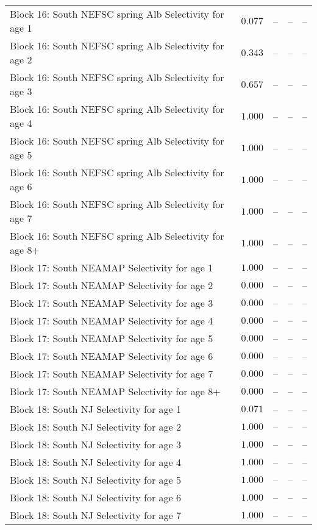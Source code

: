 \documentclass[
]{article}
\begin{document}
\begin{landscape}
\begin{longtable}[t]{lrrrr}
Block 16: South NEFSC spring Alb Selectivity for age 1 & $0.077$ & -- & -- & --\\
Block 16: South NEFSC spring Alb Selectivity for age 2 & $0.343$ & -- & -- & --\\
Block 16: South NEFSC spring Alb Selectivity for age 3 & $0.657$ & -- & -- & --\\
\addlinespace
Block 16: South NEFSC spring Alb Selectivity for age 4 & $1.000$ & -- & -- & --\\
Block 16: South NEFSC spring Alb Selectivity for age 5 & $1.000$ & -- & -- & --\\
Block 16: South NEFSC spring Alb Selectivity for age 6 & $1.000$ & -- & -- & --\\
Block 16: South NEFSC spring Alb Selectivity for age 7 & $1.000$ & -- & -- & --\\
Block 16: South NEFSC spring Alb Selectivity for age 8+ & $1.000$ & -- & -- & --\\
\addlinespace
Block 17: South NEAMAP Selectivity for age 1 & $1.000$ & -- & -- & --\\
Block 17: South NEAMAP Selectivity for age 2 & $0.000$ & -- & -- & --\\
Block 17: South NEAMAP Selectivity for age 3 & $0.000$ & -- & -- & --\\
Block 17: South NEAMAP Selectivity for age 4 & $0.000$ & -- & -- & --\\
Block 17: South NEAMAP Selectivity for age 5 & $0.000$ & -- & -- & --\\
\addlinespace
Block 17: South NEAMAP Selectivity for age 6 & $0.000$ & -- & -- & --\\
Block 17: South NEAMAP Selectivity for age 7 & $0.000$ & -- & -- & --\\
Block 17: South NEAMAP Selectivity for age 8+ & $0.000$ & -- & -- & --\\
Block 18: South NJ Selectivity for age 1 & $0.071$ & -- & -- & --\\
Block 18: South NJ Selectivity for age 2 & $1.000$ & -- & -- & --\\
\addlinespace
Block 18: South NJ Selectivity for age 3 & $1.000$ & -- & -- & --\\
Block 18: South NJ Selectivity for age 4 & $1.000$ & -- & -- & --\\
Block 18: South NJ Selectivity for age 5 & $1.000$ & -- & -- & --\\
Block 18: South NJ Selectivity for age 6 & $1.000$ & -- & -- & --\\
Block 18: South NJ Selectivity for age 7 & $1.000$ & -- & -- & --\\

\end{longtable}
\end{landscape}
\end{document}
